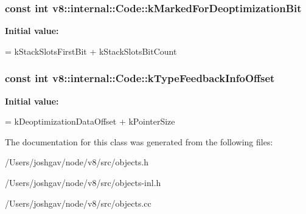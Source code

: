 \subsubsection[{\texorpdfstring{k\+Marked\+For\+Deoptimization\+Bit}{kMarkedForDeoptimizationBit}}]{\setlength{\rightskip}{0pt plus 5cm}const int v8\+::internal\+::\+Code\+::k\+Marked\+For\+Deoptimization\+Bit\hspace{0.3cm}{\ttfamily [static]}}\hypertarget{classv8_1_1internal_1_1_code_a407472d202e070f89c3bd23a485d67be}{}\label{classv8_1_1internal_1_1_code_a407472d202e070f89c3bd23a485d67be}
{\bfseries Initial value\+:}
\begin{DoxyCode}
=
      kStackSlotsFirstBit + kStackSlotsBitCount
\end{DoxyCode}
\subsubsection[{\texorpdfstring{k\+Type\+Feedback\+Info\+Offset}{kTypeFeedbackInfoOffset}}]{\setlength{\rightskip}{0pt plus 5cm}const int v8\+::internal\+::\+Code\+::k\+Type\+Feedback\+Info\+Offset\hspace{0.3cm}{\ttfamily [static]}}\hypertarget{classv8_1_1internal_1_1_code_a5ec9f802ed75109281eb87650ba00e6d}{}\label{classv8_1_1internal_1_1_code_a5ec9f802ed75109281eb87650ba00e6d}
{\bfseries Initial value\+:}
\begin{DoxyCode}
=
      kDeoptimizationDataOffset + kPointerSize
\end{DoxyCode}


The documentation for this class was generated from the following files\+:\begin{DoxyCompactItemize}
\item 
/\+Users/joshgav/node/v8/src/objects.\+h\item 
/\+Users/joshgav/node/v8/src/objects-\/inl.\+h\item 
/\+Users/joshgav/node/v8/src/objects.\+cc\end{DoxyCompactItemize}
